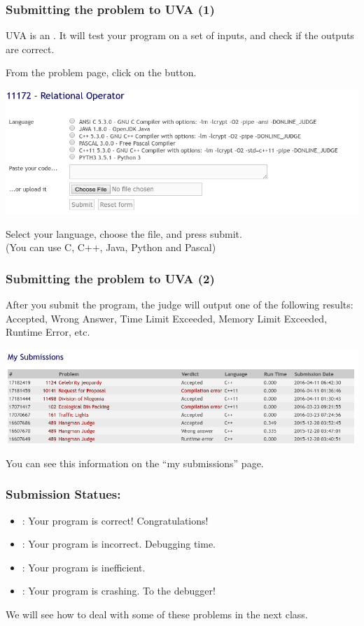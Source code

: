 \documentclass{beamer}
\begin{document}
\begin{frame}
  \frametitle{Submitting the problem to UVA (1)}

  {\small
  UVA is an . It will test your
  program on a set of inputs, and check if the outputs are correct.

  From the problem page, click on the  button. 
  
  \begin{center}
    \includegraphics[width=.8\textwidth]{../img/submitpage}
  \end{center}
  
  Select your language, choose the file, and press submit.\\
  (You can use C, C++, Java, Python {\tiny and Pascal})}
\end{frame}

\begin{frame}
  \frametitle{Submitting the problem to UVA (2)}

  {\small
    After you submit the program, the judge will output one of the
    following results: Accepted, Wrong Answer, Time Limit Exceeded,
    Memory Limit Exceeded, Runtime Error, etc.
    
    \begin{center}
      \includegraphics[width=.8\textwidth]{../img/submissionpage}
    \end{center}

    You can see this information on the ``my submissions'' page.
  }
\end{frame}

\begin{frame}
  \frametitle{Submission Statues:}
  \begin{itemize}
  \item {}: Your program is correct!
    Congratulations!
  \item {}: Your program is incorrect. Debugging
    time.
  \item {}: Your program is
    inefficient.
  \item {}: Your program is crashing. To the
    debugger!
  \end{itemize}

  \bigskip

  We will see how to deal with some of these problems in the next class.
\end{frame}
\end{document}
